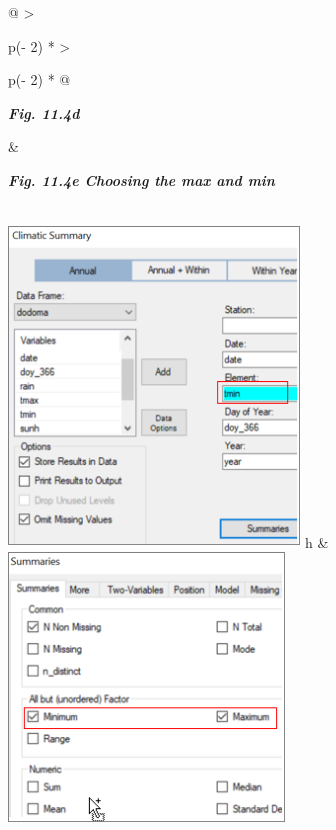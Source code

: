 \documentclass[
  letterpaper,
  DIV=11,
  numbers=noendperiod]{scrreprt}
\begin{document}
\begin{longtable}[]{@{}
  >{\raggedright\arraybackslash}p{(\columnwidth - 2\tabcolsep) * }
  >{\raggedright\arraybackslash}p{(\columnwidth - 2\tabcolsep) * }@{}}
\toprule\noalign{}
\begin{minipage}[b]{\linewidth}\raggedright
\textbf{\emph{Fig. 11.4d}}
\end{minipage} & \begin{minipage}[b]{\linewidth}\raggedright
\textbf{\emph{Fig. 11.4e Choosing the max and min}}
\end{minipage} \\
\midrule\noalign{}
\endhead
\bottomrule\noalign{}
\endlastfoot
\includegraphics[width=3.0453in,height=3.37138in]{figures/Fig11.4d.png}
h &
\includegraphics[width=2.89033in,height=\textheight]{figures/Fig11.4e.png} \\
\end{longtable}
\end{document}
